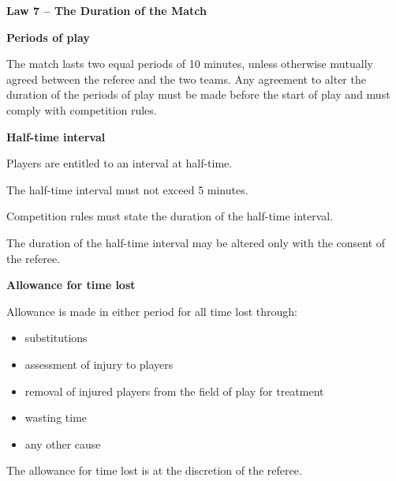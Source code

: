 \clearpage
\sffamily
{\bfseries\color[rgb]{0.4,0.4,0.4}
Law 7 -- The Duration of the Match}
{}

\bigskip

{\bfseries Periods of play }

\headlinebox

The match lasts two equal periods of 10 minutes,
unless otherwise mutually agreed between the referee and the two teams.
Any agreement to alter the duration of the periods of play must be made before
the start of play and must comply with competition rules.

\bigskip

{\bfseries Half-time interval}

\headlinebox

Players are entitled to an interval at half-time.

The half-time interval must not exceed 5 minutes.

Competition rules must state the duration of the half-time interval.

The duration of the half-time interval may be altered only with the consent of the referee. 

\bigskip

{\bfseries Allowance for time lost}

\headlinebox

Allowance is made in either period for all time lost through: 

\begin{itemize}
\item substitutions
\item assessment of injury to players
\item removal of injured players from the field of play for treatment 
\item wasting time
\item any other cause
\end{itemize}

The allowance for time lost is at the discretion of the referee.

